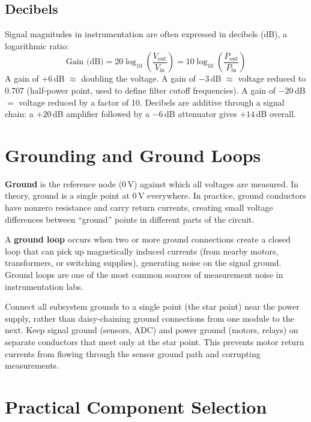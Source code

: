 \documentclass[11pt,letterpaper,twoside,openany]{book}
\begin{document}
\subsection{Decibels}
Signal magnitudes in instrumentation are often expressed in decibels (dB), a logarithmic ratio:
\begin{equation}
\text{Gain (dB)} = 20 \log_{10}\left(\frac{V_{\text{out}}}{V_{\text{in}}}\right) = 10 \log_{10}\left(\frac{P_{\text{out}}}{P_{\text{in}}}\right)
\end{equation}
A gain of $+6$\,dB $\approx$ doubling the voltage. A gain of $-3$\,dB $\approx$ voltage reduced to 0.707 (half-power point, used to define filter cutoff frequencies). A gain of $-20$\,dB $=$ voltage reduced by a factor of 10. Decibels are additive through a signal chain: a $+20$\,dB amplifier followed by a $-6$\,dB attenuator gives $+14$\,dB overall.

\section{Grounding and Ground Loops}

\textbf{Ground} is the reference node (0\,V) against which all voltages are measured. In theory, ground is a single point at 0\,V everywhere. In practice, ground conductors have nonzero resistance and carry return currents, creating small voltage differences between ``ground'' points in different parts of the circuit.

A \textbf{ground loop} occurs when two or more ground connections create a closed loop that can pick up magnetically induced currents (from nearby motors, transformers, or switching supplies), generating noise on the signal ground. Ground loops are one of the most common sources of measurement noise in instrumentation labs.

\begin{tipbox}
Connect all subsystem grounds to a single point (the star point) near the power supply, rather than daisy-chaining ground connections from one module to the next. Keep signal ground (sensors, ADC) and power ground (motors, relays) on separate conductors that meet only at the star point. This prevents motor return currents from flowing through the sensor ground path and corrupting measurements.
\end{tipbox}

\section{Practical Component Selection}
\end{document}

